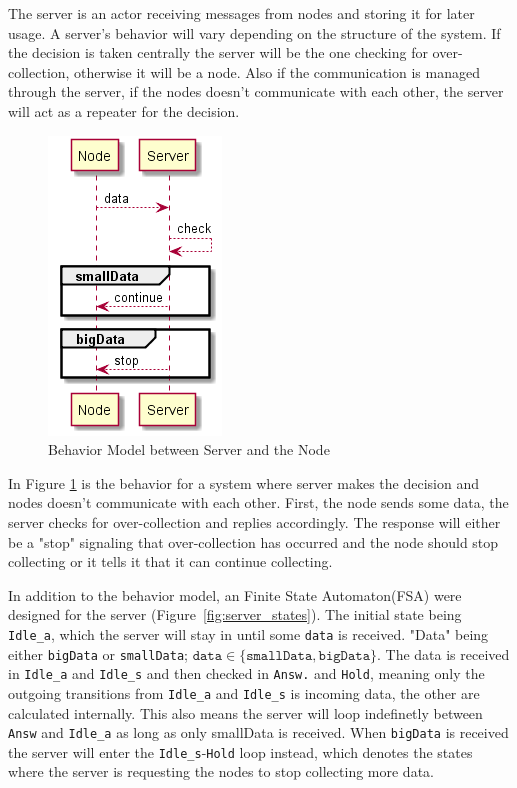The server is an actor receiving messages from nodes and storing it for later usage. A server's behavior will vary depending on the structure of the system. If the decision is taken centrally the server will be the one checking for over-collection, otherwise it will be a node. Also if the communication is managed through the server, if the nodes doesn't communicate with each other, the server will act as a repeater for the decision. 

\begin{figure}[ht]
    \includegraphics{include/figures/server_behav}
    \caption{Behavior Model between Server and the Node}
    \label{fig:node_server_behav}
\end{figure}

In Figure \ref{fig:node_server_behav} is the behavior for a system where server makes the decision and nodes doesn't communicate with each other. First, the node sends some data, the server checks for over-collection and replies accordingly. The response will either be a "stop" signaling that over-collection has occurred and the node should stop collecting or it tells it that it can continue collecting. 

In addition to the behavior model, an Finite State Automaton(FSA) were designed for the server (Figure~\ref{fig:server_states}). The initial state being \texttt{Idle\_a}, which the server will stay in until some \texttt{data} is received. "Data" being either \texttt{bigData} or \texttt{smallData}; $ \texttt{data} \in \{ \texttt{smallData}, \texttt{bigData} \} $. The data is received in \texttt{Idle\_a} and \texttt{Idle\_s} and then checked in \texttt{Answ.} and \texttt{Hold}, meaning only the outgoing transitions from \texttt{Idle\_a} and \texttt{Idle\_s} is incoming data, the other are calculated internally. This also means the server will loop indefinetly between \texttt{Answ} and \texttt{Idle\_a} as long as only smallData is received. When \texttt{bigData} is received the server will enter the \texttt{Idle\_s}-\texttt{Hold} loop instead, which denotes the states where the server is requesting the nodes to stop collecting more data. 

